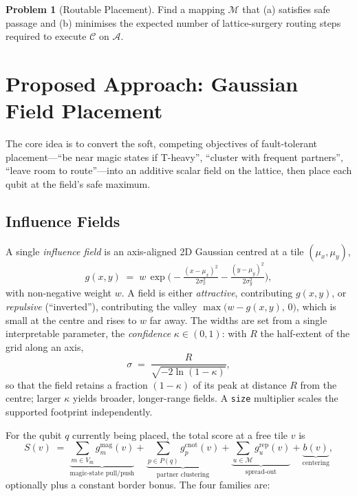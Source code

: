 \documentclass[10pt,conference]{IEEEtran}
\theoremstyle{definition}
\newtheorem{problem}{Problem}
\theoremstyle{remark}
\newcommand{\A}{\mathcal{A}}            %
\newcommand{\C}{\mathcal{C}}            %
\newcommand{\M}{\mathcal{M}}            %
\begin{document}
\begin{problem}[Routable Placement]
    Find a mapping $\M$ that (a) satisfies safe passage and (b) minimises the
    expected number of lattice-surgery routing steps required to execute $\C$
    on $\A$.
\end{problem}

\section{Proposed Approach: Gaussian Field Placement}
\label{sec:approach}

The core idea is to convert the soft, competing objectives of fault-tolerant
placement---``be near magic states if T-heavy'', ``cluster with frequent
partners'', ``leave room to route''---into an additive scalar field on the
lattice, then place each qubit at the field's safe maximum.

\subsection{Influence Fields}
\label{sec:fields}

A single \emph{influence field} is an axis-aligned 2D Gaussian centred at a tile
$(\mu_x,\mu_y)$,
\begin{equation}
g(x,y) \;=\; w\,\exp\!\Big(\!-\tfrac{(x-\mu_x)^2}{2\sigma_x^2}
                              -\tfrac{(y-\mu_y)^2}{2\sigma_y^2}\Big),
\label{eq:gauss}
\end{equation}
with non-negative weight $w$. A field is either \emph{attractive}, contributing
$g(x,y)$, or \emph{repulsive} (``inverted''), contributing the valley
$\max\!\big(w-g(x,y),\,0\big)$, which is small at the centre and rises to $w$
far away. The widths are set from a single interpretable parameter, the
\emph{confidence} $\kappa\in(0,1)$: with $R$ the half-extent of the grid along
an axis,
\begin{equation}
\sigma \;=\; \frac{R}{\sqrt{-2\ln(1-\kappa)}},
\label{eq:sigma}
\end{equation}
so that the field retains a fraction $(1-\kappa)$ of its peak at distance $R$
from the centre; larger $\kappa$ yields broader, longer-range fields. A
\texttt{size} multiplier scales the supported footprint independently.

For the qubit $q$ currently being placed, the total score at a free tile $v$ is
\begin{equation}
S(v) \;=\;
   \underbrace{\sum_{m\in V_{\mathrm m}}\! g^{\mathrm{mag}}_m(v)}_{\text{magic-state pull/push}}
 + \underbrace{\sum_{p\in P(q)}\! g^{\mathrm{cnot}}_p(v)}_{\text{partner clustering}}
 + \underbrace{\sum_{u\in \M}\! g^{\mathrm{rep}}_u(v)}_{\text{spread-out}}
 + \underbrace{b(v)}_{\text{centering}},
\label{eq:score}
\end{equation}
optionally plus a constant border bonus. The four families are:
\end{document}
